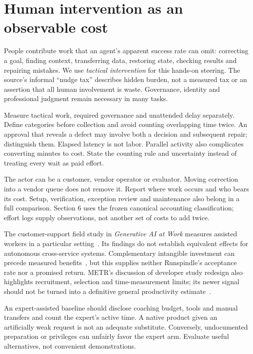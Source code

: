 \documentclass[11pt,letterpaper]{article}
\begin{document}
\section{Human intervention as an observable cost}
\label{sec:effort}
People contribute work that an agent's apparent success rate can omit: correcting
a goal, finding context, transferring data, restoring state, checking results and
repairing mistakes. We use \emph{tactical intervention} for this hands-on steering.
The source's informal ``nudge tax'' describes hidden burden, not a measured tax
or an assertion that all human involvement is waste. Governance, identity and
professional judgment remain necessary in many tasks.

Measure tactical work, required governance and unattended delay separately.
Define categories before collection and avoid counting overlapping time twice.
An approval that reveals a defect may involve both a decision and subsequent
repair; distinguish them. Elapsed latency is not labor. Parallel activity also
complicates converting minutes to cost. State the counting rule and uncertainty
instead of treating every wait as paid effort.



The actor can be a customer, vendor operator or evaluator. Moving correction into
a vendor queue does not remove it. Report where work occurs and who bears its
cost. Setup, verification, exception review and maintenance also belong in a full
comparison. Section 6 uses the frozen canonical accounting classification; effort
logs supply observations, not another set of costs to add twice.

The customer-support field study in \emph{Generative AI at Work} measures assisted
workers in a particular setting~\cite{genaiwork}. Its findings do not establish
equivalent effects for autonomous cross-service systems. Complementary intangible
investment can precede measured benefits~\cite{jcurve}, but this supplies neither
Runspindle's acceptance rate nor a promised return. METR's discussion of developer
study redesign also highlights recruitment, selection and time-measurement limits;
its newer signal should not be turned into a definitive general productivity
estimate~\cite{metr2026}.

An expert-assisted baseline should disclose coaching budget, tools and manual
transfers and count the expert's active time. A native product given an artificially
weak request is not an adequate substitute. Conversely, undocumented preparation
or privileges can unfairly favor the expert arm. Evaluate useful alternatives,
not convenient demonstrations.
\end{document}
